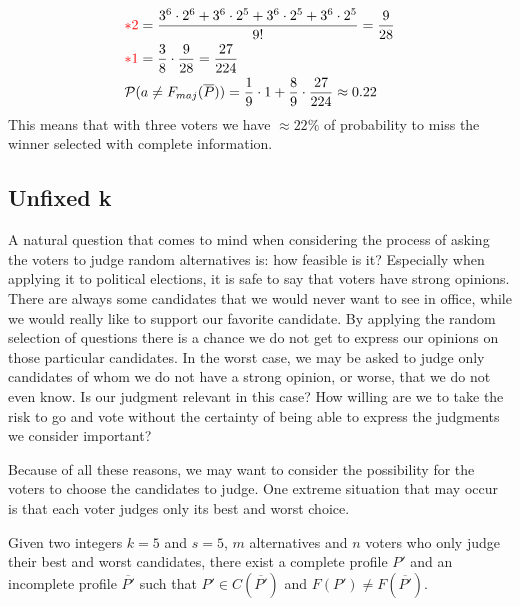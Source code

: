\documentclass[version=3.21, pagesize, twoside=off, bibliography=totoc, DIV=calc, fontsize=12pt, a4paper]{scrartcl}
\begin{document}
\begin{align}
	&{\color{red}*2} =\frac{3^6\cdot2^6+3^6\cdot2^5+3^6\cdot2^5+3^6\cdot2^5}{9!} = \frac{9}{28} \\
	&{\color{red}*1} =\frac{3}{8} \cdot \frac{9}{28} = \frac{27}{224} \\
	&\mathcal{P}(a\neq F_{maj}(\overline{P})) = \frac{1}{9} \cdot 1 + \frac{8}{9} \cdot \frac{27}{224} \approx 0.22
\end{align}
This means that with three voters we have $\approx 22\%$ of probability to miss the winner selected with complete information.

\newpage
{}
\subsection{Unfixed k}
A natural question that comes to mind when considering the process of asking the voters to judge random alternatives is: how feasible is it? Especially when applying it to political elections, it is safe to say that voters have strong opinions. There are always some candidates that we would never want to see in office, while we would really like to support our favorite candidate. By applying the random selection of questions there is a chance we do not get to express our opinions on those particular candidates. In the worst case, we may be asked to judge only candidates of whom we do not have a strong opinion, or worse, that we do not even know. Is our judgment relevant in this case? How willing are we to take the risk to go and vote without the certainty of being able to express the judgments we consider important?

Because of all these reasons, we may want to consider the possibility for the voters to choose the candidates to judge. One extreme situation that may occur is that each voter judges only its best and worst choice. 

\begin{proposition}
	Given two integers $k=5$ and $s=5$, $m$ alternatives and $n$ voters who only judge their best and worst candidates, there exist a complete profile $P'$ and an incomplete profile $\overline{P'}$ such that $P'\in C(\overline{P'})$ and $F(P')\neq F(\overline{P'})$.
\end{proposition}	
\end{document}

